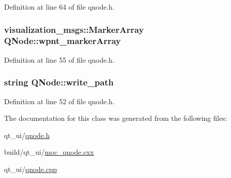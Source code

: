 Definition at line 64 of file qnode.\+h.

\subsubsection[{\texorpdfstring{wpnt\+\_\+marker\+Array}{wpnt_markerArray}}]{\setlength{\rightskip}{0pt plus 5cm}visualization\+\_\+msgs\+::\+Marker\+Array Q\+Node\+::wpnt\+\_\+marker\+Array}\hypertarget{class_q_node_a7fa96879efd44c15a8b03f3cdd9d665b}{}\label{class_q_node_a7fa96879efd44c15a8b03f3cdd9d665b}


Definition at line 55 of file qnode.\+h.

\subsubsection[{\texorpdfstring{write\+\_\+path}{write_path}}]{\setlength{\rightskip}{0pt plus 5cm}string Q\+Node\+::write\+\_\+path}\hypertarget{class_q_node_a0967d1922eeb7e39eedca309c7003d23}{}\label{class_q_node_a0967d1922eeb7e39eedca309c7003d23}


Definition at line 52 of file qnode.\+h.



The documentation for this class was generated from the following files\+:\begin{DoxyCompactItemize}
\item 
qt\+\_\+ui/\hyperlink{qnode_8h}{qnode.\+h}\item 
build/qt\+\_\+ui/\hyperlink{moc__qnode_8cxx}{moc\+\_\+qnode.\+cxx}\item 
qt\+\_\+ui/\hyperlink{qnode_8cpp}{qnode.\+cpp}\end{DoxyCompactItemize}
